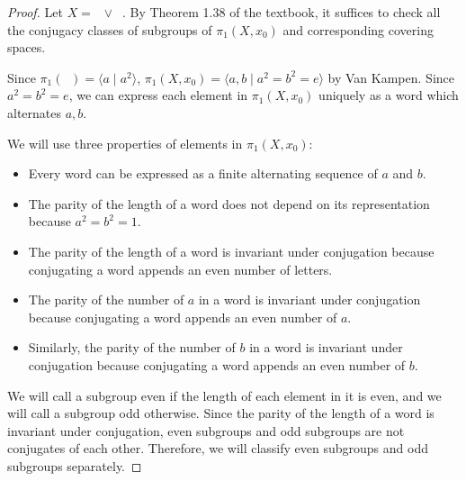 \documentclass[12pt, psamsfonts]{amsart}
\theoremstyle{definition}
\theoremstyle{remark}
\DeclareMathOperator{\RP}{\mathbb{R}\mathbf{P}^2}
\numberwithin{equation}{section}
\begin{document}
\begin{proof}
  Let $X = \RP \vee \RP$.
  By Theorem 1.38 of the textbook, it suffices to check all the conjugacy classes of subgroups of $\pi_1(X, x_0)$ and corresponding covering spaces.

  Since $\pi_1(\RP) = \langle a \mid a^2 \rangle$, $\pi_1(X, x_0) = \langle a, b \mid a^2 = b^2 = e \rangle$ by Van Kampen.
  Since $a^2 = b^2 = e$, we can express each element in $\pi_1(X, x_0)$ uniquely as a word which alternates $a, b$.

  We will use three properties of elements in $\pi_1(X, x_0)$:

  \begin{itemize}
    \item
      Every word can be expressed as a finite alternating sequence of $a$ and $b$.
    \item
      The parity of the length of a word does not depend on its representation because $a^2 = b^2 = 1$.
    \item
      The parity of the length of a word is invariant under conjugation because conjugating a word appends an even number of letters.
    \item
      The parity of the number of $a$ in a word is invariant under conjugation because conjugating a word appends an even number of $a$.
    \item
      Similarly, the parity of the number of $b$ in a word is invariant under conjugation because conjugating a word appends an even number of $b$.
  \end{itemize}

  We will call a subgroup even if the length of each element in it is even, and we will call a subgroup odd otherwise.
  Since the parity of the length of a word is invariant under conjugation, even subgroups and odd subgroups are not conjugates of each other.
  Therefore, we will classify even subgroups and odd subgroups separately.


\end{proof}
\end{document}
